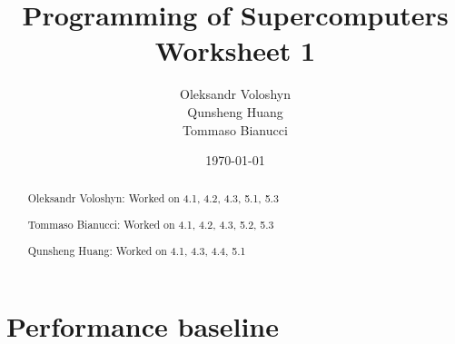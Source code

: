 \documentclass{article}
\title{Programming of Supercomputers\\Worksheet 1}
\author{Oleksandr Voloshyn\\ Qunsheng Huang\\ Tommaso Bianucci}
\date{\today}
\begin{document}
\maketitle
\renewcommand{\abstractname}{Group members's contributions}
\begin{abstract}
	Oleksandr Voloshyn: Worked on 4.1, 4.2, 4.3, 5.1, 5.3

	Tommaso Bianucci: Worked on 4.1, 4.2, 4.3, 5.2, 5.3
	
	Qunsheng Huang: Worked on 4.1, 4.3, 4.4, 5.1
\end{abstract}

\section{Performance baseline} %
\end{document}
